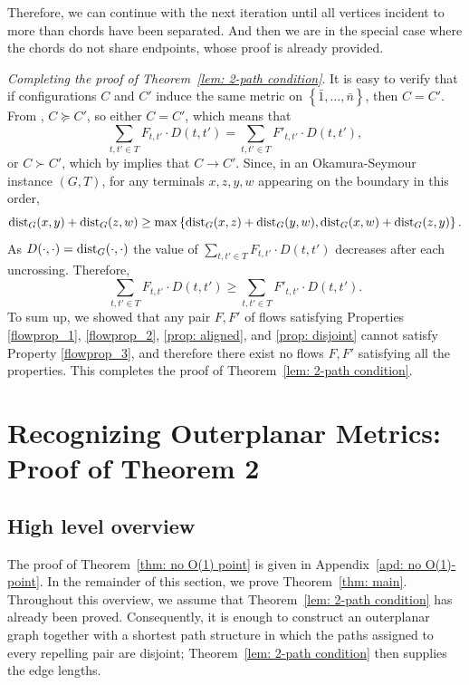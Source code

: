 \documentclass[11pt]{article}
\newcommand{\dist}{\textnormal{dist}}
\newcommand{\set}[1]{\left\{ #1 \right\}}
\begin{document}
Therefore, we can continue with the next iteration until all vertices incident to more than chords have been separated. And then we are in the special case where the chords do not share endpoints, whose proof is already provided.

\emph{Completing the proof of Theorem~\ref{lem: 2-path condition}}.
It is easy to verify that if configurations $C$ and $C'$ induce the same metric on $\set{\bar 1,\ldots,\bar n}$, then $C=C'$. From , $C\succeq C'$, so either $C=C'$, which means that 
\[\sum_{t,t'\in T}F_{t,t'}\cdot D(t,t')= \sum_{t,t'\in T}F'_{t,t'}\cdot D(t,t'),\]
or $C\succ C'$, which by  implies that $C\to C'$. Since, in an Okamura-Seymour instance $(G,T)$, for any terminals $x,z,y,w$ appearing on the boundary in this order, $$\dist_G(x,y)+\dist_G(z,w)\ge \max\set{\dist_G(x,z)+\dist_G(y,w),\dist_G(x,w)+\dist_G(z,y)}.$$ As $D(\cdot,\cdot)=\dist_G(\cdot,\cdot)$ the value of $\sum_{t,t'\in T}F_{t,t'}\cdot D(t,t')$ decreases after each uncrossing. Therefore,
\[\sum_{t,t'\in T}F_{t,t'}\cdot D(t,t')\ge  \sum_{t,t'\in T}F'_{t,t'}\cdot D(t,t').\]
To sum up, we showed that any pair $F,F'$ of flows satisfying Properties \ref{flowprop_1}, \ref{flowprop_2}, \ref{prop: aligned}, and \ref{prop: disjoint} cannot satisfy Property \ref{flowprop_3}, and therefore there exist no flows $F,F'$ satisfying all the properties. This completes the proof of Theorem~\ref{lem: 2-path condition}.




\section{Recognizing Outerplanar Metrics: Proof of Theorem 2}\label{sec:outerplanar-proof}

\subsection{High level overview}

The proof of Theorem~\ref{thm: no O(1) point} is given in Appendix~\ref{apd: no O(1)-point}. In the remainder of this section, we prove Theorem~\ref{thm: main}. Throughout this overview, we assume that Theorem~\ref{lem: 2-path condition} has already been proved. Consequently, it is enough to construct an outerplanar graph together with a shortest path structure in which the paths assigned to every repelling pair are disjoint; Theorem~\ref{lem: 2-path condition} then supplies the edge lengths.
\end{document}
